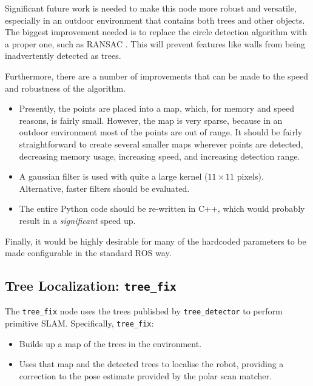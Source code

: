 \documentclass[12pt,oneside,a4paper]{book}
\begin{document}
Significant future work is needed to make this node more
robust and versatile, especially in an outdoor environment that
contains both trees and other objects. The biggest improvement needed
is to replace the circle detection algorithm with a proper one, such
as RANSAC . This will prevent features like walls from
being inadvertently detected as trees.

Furthermore, there are a number of improvements that can be made to
the speed and robustness of the algorithm.
\begin{itemize}
\item Presently, the points are placed into a map, which, for memory
  and speed reasons, is fairly small. However, the map is very sparse,
  because in an outdoor environment most of the points are out of range.
  It should be fairly straightforward to create several smaller maps
  wherever points are detected, decreasing memory usage, increasing
  speed, and increasing detection range.
\item A gaussian filter is used with quite a large kernel ($11 \times
  11$ pixels). Alternative, faster filters should be evaluated.
\item The entire Python code should be re-written in C++, which would
  probably result in a \emph{significant} speed up.
\end{itemize}

Finally, it would be highly desirable for many of the hardcoded
parameters to be made configurable in the standard ROS way.

\subsection{Tree Localization: \texttt{tree\_fix}}
\label{sec:tree_fix}

The \texttt{tree\_fix} node uses the trees published by
\texttt{tree\_detector} to perform primitive SLAM. Specifically, \texttt{tree\_fix}:
\begin{itemize}
\item Builds up a map of the trees in the environment.
\item Uses that map and the detected trees to localise the robot,
  providing a correction to the pose estimate provided by the polar
  scan matcher.
\end{itemize}
\end{document}

